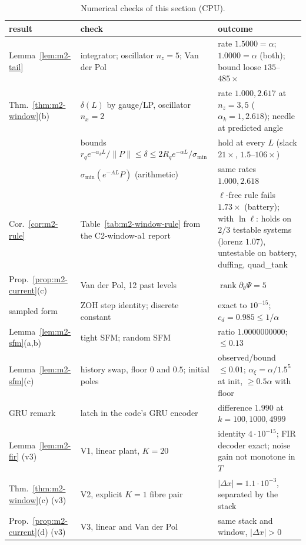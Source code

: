 \begin{table}[ht]\centering\footnotesize
\caption{Numerical checks of this section (CPU).}\label{tab:m2-checks}
\begin{tabular}{@{}lp{4.6cm}p{7.4cm}@{}}\hline
result & check & outcome\\\hline
Lemma~\ref{lem:m2-tail} & integrator; oscillator $n_z=5$; Van der Pol & rate $1.5000=\alpha$; $1.0000=\alpha$ (both); bound loose $135$--$485\times$\\
Thm.~\ref{thm:m2-window}(b) & $\delta(L)$ by gauge/LP, oscillator $n_x=2$ & rate $1.000,2.617$ at $n_z=3,5$ ($\alpha_k=1,2.618$); needle at predicted angle\\
 & bounds $r_qe^{-\alpha_kL}/\|P\|\le\delta\le2R_qe^{-\alpha L}/\sigma_{\min}$ & hold at every $L$ (slack $21\times$, $1.5$--$106\times$)\\
 & $\sigma_{\min}(e^{-AL}P)$ (arithmetic) & same rates $1.000,2.618$\\
Cor.~\ref{cor:m2-rule} & Table~\ref{tab:m2-window-rule} from the C2-window-a1 report & $\ell$-free rule fails $1.73\times$ (battery); with $\ln\ell$: holds on $2/3$ testable systems (lorenz $1.07$), untestable on battery, duffing, quad\_tank\\
Prop.~\ref{prop:m2-current}(c) & Van der Pol, 12 past levels & $\operatorname{rank}\partial_\theta\Psi=5$\\
sampled form & ZOH step identity; discrete constant & exact to $10^{-15}$; $c_d=0.985\le1/\alpha$\\
Lemma~\ref{lem:m2-sfm}(a,b) & tight SFM; random SFM & ratio $1.0000000000$; $\le0.13$\\
Lemma~\ref{lem:m2-sfm}(c) & history swap, floor $0$ and $0.5$; initial poles & observed/bound $\le0.01$; $\alpha_\xi=\alpha/1.5^5$ at init, $\ge0.5\alpha$ with floor\\
GRU remark & latch in the code's GRU encoder & difference $1.990$ at $k=100,1000,4999$\\
Lemma~\ref{lem:m2-fir} (v3) & V1, linear plant, $K=20$ & identity $4\cdot10^{-15}$; FIR decoder exact; noise gain not monotone in $T$\\
Thm.~\ref{thm:m2-window}(c) (v3) & V2, explicit $K=1$ fibre pair & $|\Delta x|=1.1\cdot10^{-3}$, separated by the stack\\
Prop.~\ref{prop:m2-current}(d) (v3) & V3, linear and Van der Pol & same stack and window, $|\Delta x|>0$\\\hline
\end{tabular}
\end{table}

